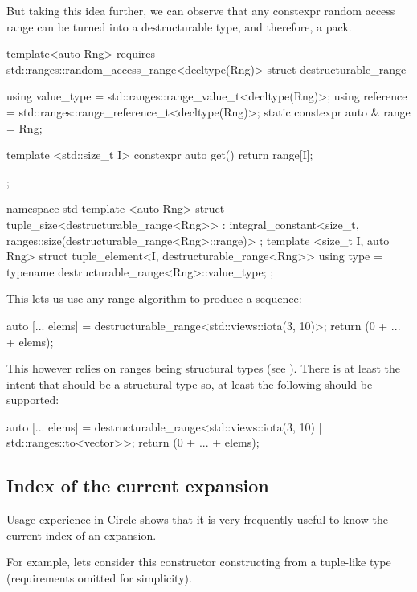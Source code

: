 \documentclass{wg21}
\begin{document}
But taking this idea further, we can observe that any constexpr random access range can be turned into a destructurable type, and therefore, a pack.

\begin{colorblock}
template<auto Rng>
requires std::ranges::random_access_range<decltype(Rng)>
struct destructurable_range {
    using value_type = std::ranges::range_value_t<decltype(Rng)>;
    using reference  = std::ranges::range_reference_t<decltype(Rng)>;
    static constexpr auto & range = Rng;

    template <std::size_t I>
    constexpr auto get() {
        return range[I];
    }
};

namespace std {
    template <auto Rng>
    struct tuple_size<destructurable_range<Rng>>
    : integral_constant<size_t, ranges::size(destructurable_range<Rng>::range)>
    { };
    template <size_t I,  auto Rng>
    struct tuple_element<I, destructurable_range<Rng>> {
        using type = typename destructurable_range<Rng>::value_type;
    };
}
\end{colorblock}

This lets us use any range algorithm to produce a sequence:

\begin{colorblock}
auto [... elems] = destructurable_range<std::views::iota(3, 10)>{};
return (0 + ... + elems);
\end{colorblock}


This however relies on ranges being structural types (see ).
There is at least the intent that  should be a structural type so, at least the following should be supported:

\begin{colorblock}
auto [... elems] = destructurable_range<std::views::iota(3, 10) | std::ranges::to<vector>>{};
return (0 + ... + elems);
\end{colorblock}

\subsection{Index of the current expansion}

Usage experience in Circle shows that it is very frequently useful
to know the current index of an expansion.

For example, lets consider this  constructor constructing from a tuple-like type
(requirements omitted for simplicity).
\end{document}
